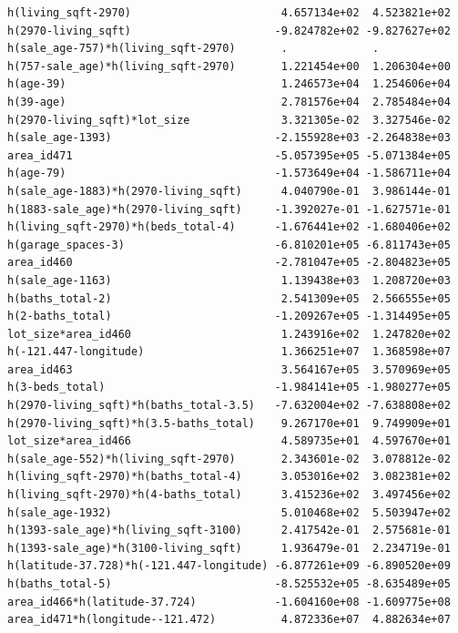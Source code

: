 \documentclass[
]{article}
\begin{document}
\begin{verbatim}
h(living_sqft-2970)                       4.657134e+02  4.523821e+02
h(2970-living_sqft)                      -9.824782e+02 -9.827627e+02
h(sale_age-757)*h(living_sqft-2970)       .             .           
h(757-sale_age)*h(living_sqft-2970)       1.221454e+00  1.206304e+00
h(age-39)                                 1.246573e+04  1.254606e+04
h(39-age)                                 2.781576e+04  2.785484e+04
h(2970-living_sqft)*lot_size              3.321305e-02  3.327546e-02
h(sale_age-1393)                         -2.155928e+03 -2.264838e+03
area_id471                               -5.057395e+05 -5.071384e+05
h(age-79)                                -1.573649e+04 -1.586711e+04
h(sale_age-1883)*h(2970-living_sqft)      4.040790e-01  3.986144e-01
h(1883-sale_age)*h(2970-living_sqft)     -1.392027e-01 -1.627571e-01
h(living_sqft-2970)*h(beds_total-4)      -1.676441e+02 -1.680406e+02
h(garage_spaces-3)                       -6.810201e+05 -6.811743e+05
area_id460                               -2.781047e+05 -2.804823e+05
h(sale_age-1163)                          1.139438e+03  1.208720e+03
h(baths_total-2)                          2.541309e+05  2.566555e+05
h(2-baths_total)                         -1.209267e+05 -1.314495e+05
lot_size*area_id460                       1.243916e+02  1.247820e+02
h(-121.447-longitude)                     1.366251e+07  1.368598e+07
area_id463                                3.564167e+05  3.570969e+05
h(3-beds_total)                          -1.984141e+05 -1.980277e+05
h(2970-living_sqft)*h(baths_total-3.5)   -7.632004e+02 -7.638808e+02
h(2970-living_sqft)*h(3.5-baths_total)    9.267170e+01  9.749909e+01
lot_size*area_id466                       4.589735e+01  4.597670e+01
h(sale_age-552)*h(living_sqft-2970)       2.343601e-02  3.078812e-02
h(living_sqft-2970)*h(baths_total-4)      3.053016e+02  3.082381e+02
h(living_sqft-2970)*h(4-baths_total)      3.415236e+02  3.497456e+02
h(sale_age-1932)                          5.010468e+02  5.503947e+02
h(1393-sale_age)*h(living_sqft-3100)      2.417542e-01  2.575681e-01
h(1393-sale_age)*h(3100-living_sqft)      1.936479e-01  2.234719e-01
h(latitude-37.728)*h(-121.447-longitude) -6.877261e+09 -6.890520e+09
h(baths_total-5)                         -8.525532e+05 -8.635489e+05
area_id466*h(latitude-37.724)            -1.604160e+08 -1.609775e+08
area_id471*h(longitude--121.472)          4.872336e+07  4.882634e+07
                                                                    

\end{verbatim}
\end{document}
